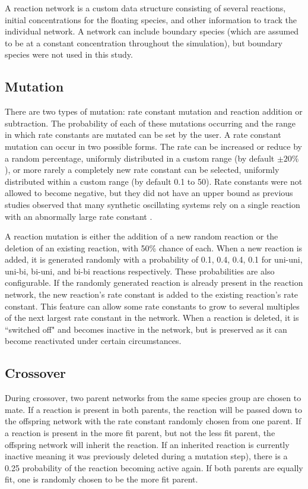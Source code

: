 \documentclass[12pt]{report}
\begin{document}
A reaction network is a custom data structure consisting of several reactions, initial concentrations for the floating species, and other information to track the individual network. A network can include boundary species (which are assumed to be at a constant concentration throughout the simulation), but boundary species were not used in this study.

\subsection{Mutation}
\label{section: mutation}
There are two types of mutation: rate constant mutation and reaction addition or subtraction. The probability of each of these mutations occurring and the range in which rate constants are mutated can be set by the user. A rate constant mutation can occur in two possible forms. The rate can be increased or reduce by a random percentage, uniformly distributed in a custom range (by default $\pm20\%$), or more rarely a completely new rate constant can be selected, uniformly distributed within a custom range (by default 0.1 to 50). Rate constants were not allowed to become negative, but they did not have an upper bound as previous studies observed that many synthetic oscillating systems rely on a single reaction with an abnormally large rate constant \cite{Tatka2023}.

A reaction mutation is either the addition of a new random reaction or the deletion of an existing reaction, with 50\% chance of each. When a new reaction is added, it is generated randomly with a 
probability of 0.1, 0.4, 0.4, 0.1 for uni-uni, uni-bi, bi-uni, and bi-bi reactions respectively. These probabilities are also configurable. If the randomly generated reaction is already present in the reaction network, the new reaction's rate constant is added to the existing reaction's rate constant. This feature can allow some rate constants to grow to several multiples of the next largest rate constant in the network. When a reaction is deleted, it is ``switched off" and becomes inactive in the network, but is preserved as it can become reactivated under certain circumstances.

\subsection{Crossover}
During crossover, two parent networks from the same species group are chosen to mate. If a reaction is present in both parents, the reaction will be passed down to the offspring network with the rate constant randomly chosen from one parent. If a reaction is present in the more fit parent, but not the less fit parent, the offspring network will inherit the reaction. If an inherited reaction is currently inactive meaning it was previously deleted during a mutation step), there is a 0.25 probability of the reaction becoming active again. If both parents are equally fit, one is randomly chosen to be the more fit parent. 
\end{document}
